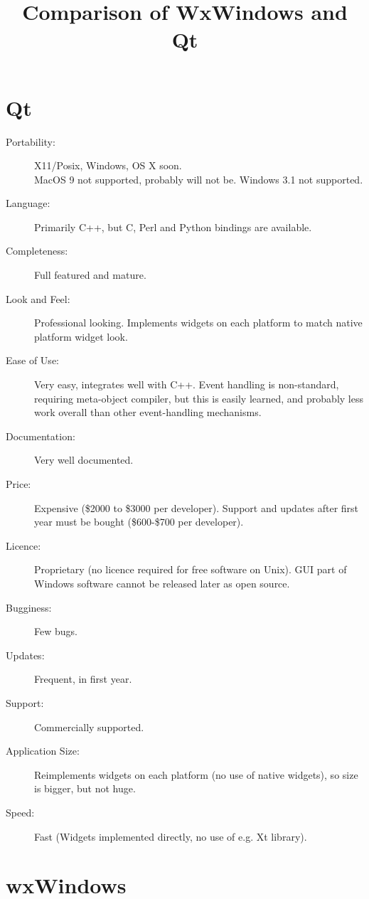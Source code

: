 \documentclass[12pt,a4paper]{article}
\begin{document}
\title{Comparison of WxWindows and Qt}
\date{}
\maketitle

\thispagestyle{empty}

\section*{Qt}
\begin{description}
\item[Portability:]
X11/Posix, Windows, OS X soon. \\
MacOS 9 not supported, probably will not be.
Windows 3.1 not supported.
\item[Language:] Primarily C++, but C, Perl and Python bindings are
  available.
\item[Completeness:]
Full featured and mature.
\item[Look and Feel:] Professional looking. Implements widgets on each
  platform to match native platform widget look.
\item[Ease of Use:] Very easy, integrates well with C++. Event
  handling is non-standard, requiring meta-object compiler, but this
  is easily learned, and probably less work overall than other
  event-handling mechanisms.
\item[Documentation:] Very well documented.
\item[Price:]Expensive (\$2000 to \$3000 per developer). Support and
  updates after first year must be bought (\$600-\$700 per developer).
\item[Licence:] Proprietary (no licence required for free software on
  Unix). GUI part of Windows software cannot be released later as open
  source.
\item[Bugginess:]
Few bugs.
\item[Updates:]Frequent, in first year.
\item[Support:]Commercially supported.
\item[Application Size:]Reimplements widgets on each platform (no use
  of native widgets), so size is bigger, but not huge.
\item[Speed:] Fast (Widgets implemented directly, no use of e.g. Xt
  library).

\end{description}

\section*{wxWindows}
\end{document}

